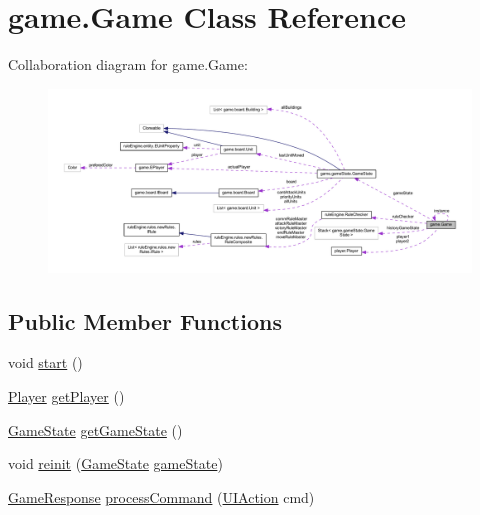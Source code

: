 \hypertarget{classgame_1_1_game}{}\section{game.\+Game Class Reference}
\label{classgame_1_1_game}


Collaboration diagram for game.\+Game\+:
\nopagebreak
\begin{figure}[H]
\begin{center}
\leavevmode
\includegraphics[width=350pt]{classgame_1_1_game__coll__graph}
\end{center}
\end{figure}
\subsection*{Public Member Functions}
\begin{DoxyCompactItemize}
\item 
void \mbox{\hyperlink{classgame_1_1_game_aaf75940b0f76230037ff41f72b73909d}{start}} ()
\item 
\mbox{\hyperlink{interfaceplayer_1_1_player}{Player}} \mbox{\hyperlink{classgame_1_1_game_aef9aa5894fc276e5699e323156463e24}{get\+Player}} ()
\item 
\mbox{\hyperlink{classgame_1_1game_state_1_1_game_state}{Game\+State}} \mbox{\hyperlink{classgame_1_1_game_a21ddf7c79b79b1fd7e433082107fdeaa}{get\+Game\+State}} ()
\item 
void \mbox{\hyperlink{classgame_1_1_game_a901ff06a39733ad5f8cf080f5833e252}{reinit}} (\mbox{\hyperlink{classgame_1_1game_state_1_1_game_state}{Game\+State}} \mbox{\hyperlink{classgame_1_1_game_a9b3fdf71d39fee9650f49b4dd320bcb2}{game\+State}})
\item 
\mbox{\hyperlink{classui_1_1_game_response}{Game\+Response}} \mbox{\hyperlink{classgame_1_1_game_a8016a543126f802488e94125daccce45}{process\+Command}} (\mbox{\hyperlink{classui_1_1_u_i_action}{U\+I\+Action}} cmd)
\end{DoxyCompactItemize}
